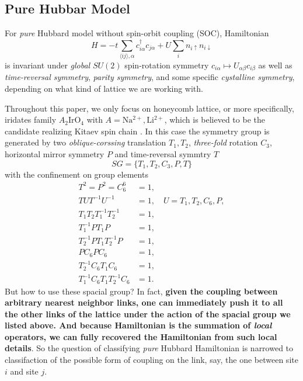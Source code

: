 \documentclass[10pt,nofootinbib]{revtex4}
\begin{document}
	\subsection{Pure Hubbar Model}
		For \emph{pure} Hubbard model without spin-orbit coupling (SOC), Hamiltonian
		\begin{equation}\label{1.1.1}
			H=-t\sum_{\langle ij \rangle,\alpha}c_{i \alpha}^\dagger c_{j \alpha}+U\sum_i n_{i\uparrow}n_{i\downarrow}
		\end{equation}
		is invariant under \emph{global} $SU(2)$ spin-rotation symmetry $c_{i \alpha}\mapsto U_{\alpha \beta}c_{i \beta}$ as well as \emph{time-reversal symmetry}, \emph{parity symmetry}, and some specific \emph{cystalline symmetry}, depending on what kind of lattice we are working with.\par
		Throughout this paper, we only focus on honeycomb lattice, or more specifically, iridates family $A_2\mathrm{IrO_4}$ with $A=\mathrm{Na^{2+},Li^{2+}}$, which is believed to be the candidate realizing Kitaev spin chain \cite{kitaev2006anyons}. In this case the symmetry group is generated by two \emph{oblique-corssing} translation $T_1, T_2$, \emph{three-fold} rotation $C_3$, horizontal mirror symmetry $P$ and time-reversal symmtry $T$
		\begin{equation*}
			SG=\{T_1,T_2,C_3,P,T\}
		\end{equation*}
		with the confinement \cite{lu2010spin} on group elements
		\begin{align*}
			T^2=P^2=C_6^6&=1,\\
			TUT^{-1}U^{-1}&=1,\quad U=T_1,T_2,C_6,P,\\
			T_1T_2T_1^{-1}T_2^{-1}&=1,\\
			T_1^{-1}PT_1P&=1,\\
			T_2^{-1}PT_1T_2^{-1}P&=1,\\
			PC_6PC_6&=1,\\
			T_2^{-1}C_6T_1C_6&=1,\\
			T_1^{-1}C_6T_1T_2^{-1}C_6&=1.
		\end{align*}
		But how to use these spacial group? In fact, \textbf{given the coupling between arbitrary nearest neighbor links, one can immediately push it to all the other links of the lattice under the action of the spacial group we listed above. And because Hamiltonian is the summation of \emph{local} operators, we can fully recovered the Hamiltonian from such local details}. So the question of classifying \emph{pure} Hubbard Hamiltonian is narrowed to classifaction of the possible form of coupling on the link, say, the one between site $i$ and site $j$.
\end{document}

